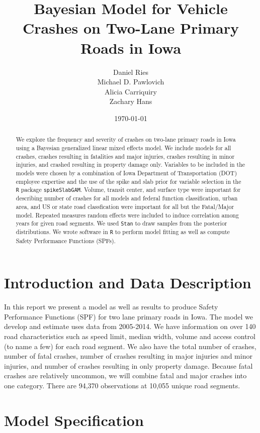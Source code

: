 \documentclass[a4paper]{article}\usepackage[]{graphicx}\usepackage[]{color}
\title{Bayesian Model for Vehicle Crashes on Two-Lane Primary Roads in Iowa}
\author{Daniel Ries \\ Michael D. Pawlovich \\ Alicia Carriquiry \\ Zachary Hans}
\date{\today}
\begin{document}
\maketitle

\begin{abstract}
We explore the frequency and severity of crashes on two-lane primary roads in Iowa using a Bayesian generalized linear mixed effects model. We include models for all crashes, crashes resulting in fatalities and major injuries, crashes resulting in minor injuries, and crashed resulting in property damage only. Variables to be included in the models were chosen by a combination of Iowa Department of Transportation (DOT) employee expertise and the use of the spike and slab prior for variable selection in the \texttt{R} package \texttt{spikeSlabGAM}. Volume, transit center, and surface type were important for describing number of crashes for all models and federal function classification, urban area, and US or state road classfication were important for all but the Fatal/Major model. Repeated measures random effects were included to induce correlation among years for given road segments. We used \texttt{Stan} to draw samples from the posterior distributions. We wrote software in \texttt{R} to perform model fitting as well as compute Safety Performance Functions (SPFs).

\end{abstract}

\tableofcontents

\section{Introduction and Data Description}

In this report we present a model as well as results to produce Safety Performance Functions (SPF) for two lane primary roads in Iowa. The model we develop and estimate uses data from 2005-2014. We have information on over 140 road characteristics such as speed limit, median width, volume and access control (to name a few) for each road segment. We also have the total number of crashes, number of fatal crashes, number of crashes resulting in major injuries and minor injuries, and number of crashes resulting in only property damage. Because fatal crashes are relatively uncommon, we will combine fatal and major crashes into one category. There are 94,370 observations at 10,055 unique road segments. 


\section{Model Specification}
\end{document}
